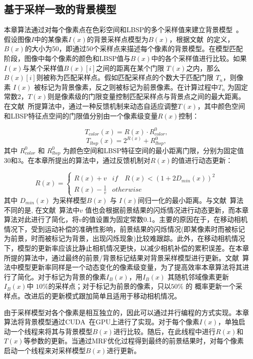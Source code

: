 \subsection{基于采样一致的背景模型}
\label {ch4:sec:sub:scam}

本章算法通过对每个像素点在色彩空间和LBSP的多个采样值来建立背景模型~\cite{subsenseTIP}。假设图像$I$中的某像素$I(x)$的背景采样点模型为$B(x)$，根据文献~的定义，$B(x)$的大小为50，即通过50个采样点来描述每个像素的背景模型。在模型匹配阶段，图像中每个像素的颜色和LBSP值与$B(x)$中的各个采样值进行比较。如果$I(x)$与某个采样值$B(x)[i]$之间的距离在某个门限 $T(x)$之内，那么$B(x)[i]$则被称为匹配采样点。假如匹配采样点的个数大于匹配门限 $ T_{n}$，则像素 $I(x)$ 被标记为背景像素，反之则被标记为前景像素。在计算过程中$T_{n}$ 为固定常数2，$T(x)$则是像素级的门限变量控制匹配采样点与背景点之间的最大距离。在文献~所提算法中，通过一种反馈机制来动态自适应调整$T(x)$，其中颜色空间和LBSP特征点空间的门限值分别由一个像素级变量$R(x)$控制：


$$T_{color}(x) = R(x) \cdot R^{0}_{color},$$
$$T_{lbsp}(x) = 2^{R(x)} + R^{0}_{lbsp},$$
其中 $R^{0}_{color}$ 和 $R^{0}_{lbsp}$ 为颜色空间和LBSP特征空间的最小距离门限，分别为固定值30和3\cite{subsenseTIP}。在本章所提出的算法中，通过反馈机制对$R(x)$的值进行动态更新：

$$ R(x) = \begin{cases}  R(x)+v & if \quad {R(x)<(1+2D_{min}(x))}^{2} \\  R(x) - \frac{1 }{v } & otherwise \end{cases}$$
其中 $D_{min}(x)$ 为采样模型$B(x)$ 与 $I(x)$间归一化的最小距离。与文献~算法不同的是, 在文献~算法中$v$ 值也会根据前景结果的闪烁情况进行动态更新，而本章算法对此进行了简化，将$v$的值设置为固定常数0.1。主要的原因在于，在移动相机情况下，受到运动补偿的准确性影响，前景结果的闪烁情况(即某像素时而被标记为前景，时而被标记为背景，出现闪烁现象)比较难跟踪。此外，在移动相机情况下，模型的更新率应该比静止相机情况更快，以减少相机补偿的累积误差。在本章所提的算法中，通过最终的前景/背景标记结果对背景采样模型进行更新。文献~算法中模型更新率同样是一个动态变化的像素级变量，为了提高效率本章算法将其进行了简化。对于标记为背景的像素$I_{B}(x)$，用$I_{B}(x)$ 其随机邻域像素更新$I_{B}(x)$中 $10\%$的采样点；对于标记为前景的像素，只以$50\% $ 的 概率更新一个采样点。改进后的更新模式跟加简单且适用于移动相机情况。 \par
由于采样模型对各个像素是相互独立的，因此可以通过并行编程的方式实现。本章算法将背景模型通过CUDA~\cite{CUDA}在GPU上进行了实现。对于每个像素$I(x)$，单独启动一个线程来将其与背景模型$B(x)$进行比较。随后，在此线程中进行$R(x)$和 $T(x)$等参数的更新。当通过MRF优化过程得到最终的前景结果时，对每个像素启动一个线程来对采样模型$B(x)$进行更新。

